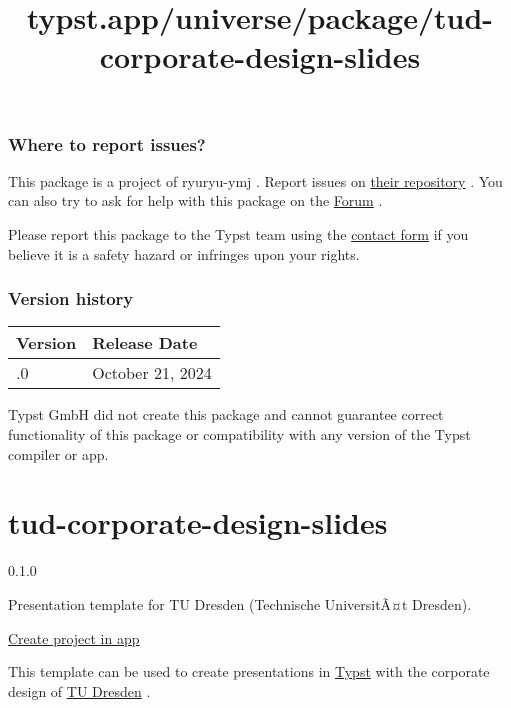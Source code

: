 \subsubsection{Where to report issues?}\label{where-to-report-issues}

This package is a project of ryuryu-ymj . Report issues on
\href{https://github.com/ryuryu-ymj/mannot}{their repository} . You can
also try to ask for help with this package on the
\href{https://forum.typst.app}{Forum} .

Please report this package to the Typst team using the
\href{https://typst.app/contact}{contact form} if you believe it is a
safety hazard or infringes upon your rights.

\label{versions}
\subsubsection{Version history}\label{version-history}

\begin{longtable}[]{@{}ll@{}}
\toprule\noalign{}
Version & Release Date \\
\midrule\noalign{}
\endhead
\bottomrule\noalign{}
\endlastfoot
0.1.0 & October 21, 2024 \\
\end{longtable}

Typst GmbH did not create this package and cannot guarantee correct
functionality of this package or compatibility with any version of the
Typst compiler or app.


\title{typst.app/universe/package/tud-corporate-design-slides}

\label{banner}
\label{template-thumbnail}

\section{tud-corporate-design-slides}\label{tud-corporate-design-slides}

{ 0.1.0 }

Presentation template for TU Dresden (Technische UniversitÃ¤t Dresden).

\href{/app?template=tud-corporate-design-slides&version=0.1.0}{Create
project in app}

\label{readme}
This template can be used to create presentations in
\href{https://github.com/typst/typst}{Typst} with the corporate design
of \href{https://www.tu-dresden.de/}{TU Dresden} .

